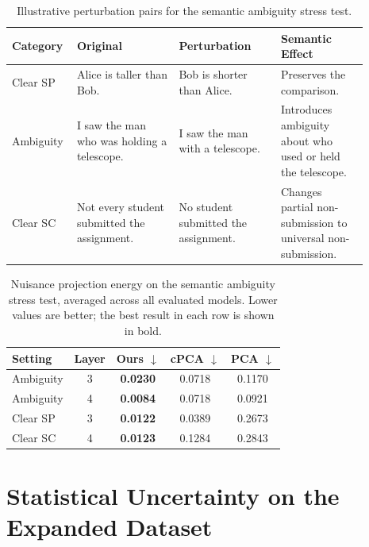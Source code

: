 \begin{table}[ht]
\centering
\small
\renewcommand{\arraystretch}{1.15}
\begin{tabular}{p{0.12\linewidth} p{0.27\linewidth}
                p{0.27\linewidth} p{0.23\linewidth}}
\toprule
Category & Original & Perturbation & Semantic Effect \\
\midrule
Clear SP
& Alice is taller than Bob.
& Bob is shorter than Alice.
& Preserves the comparison. \\
\addlinespace
Ambiguity
& I saw the man who was holding a telescope.
& I saw the man with a telescope.
& Introduces ambiguity about who used or held the telescope. \\
\addlinespace
Clear SC
& Not every student submitted the assignment.
& No student submitted the assignment.
& Changes partial non-submission to universal non-submission. \\
\bottomrule
\end{tabular}
\vspace{0.4em}
\caption{Illustrative perturbation pairs for the semantic ambiguity stress test.}
\label{tab:ambiguity_examples}
\vspace{-1.0em}
\end{table}

\begin{table}[t]
\centering
\small
\setlength{\tabcolsep}{6pt}
\renewcommand{\arraystretch}{1.15}
\begin{tabular}{lcccc}
\toprule
Setting & Layer & Ours $\downarrow$ & cPCA $\downarrow$
& PCA $\downarrow$ \\
\midrule
Ambiguity & 3 & \textbf{0.0230} & 0.0718 & 0.1170 \\
Ambiguity & 4 & \textbf{0.0084} & 0.0718 & 0.0921 \\
Clear SP  & 3 & \textbf{0.0122} & 0.0389 & 0.2673 \\
Clear SC  & 4 & \textbf{0.0123} & 0.1284 & 0.2843 \\
\bottomrule
\end{tabular}
\vspace{0.4em}
\caption{Nuisance projection energy on the semantic ambiguity stress test, averaged across all evaluated models. Lower values are better; the best result in each row is shown in bold.}
\label{tab:ambiguity_results}
\vspace{-1.0em}
\end{table}


\section{Statistical Uncertainty on the Expanded Dataset}
\label{app:bootstrap}

